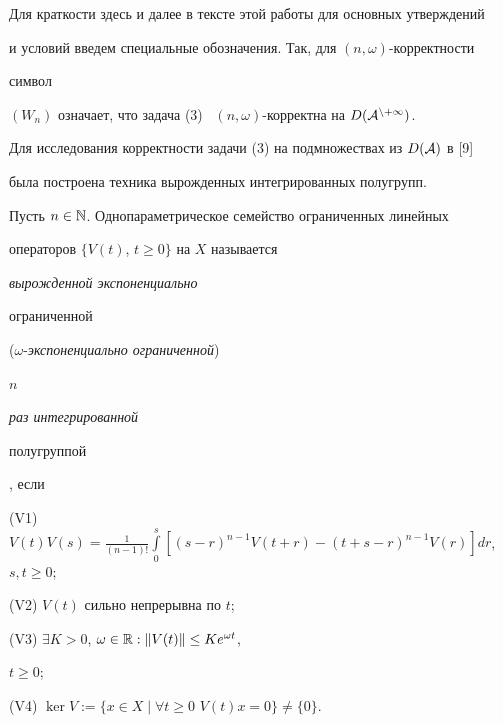  


Для краткости здесь и далее в тексте этой работы для основных утверждений 


и условий введем специальные обозначения. Так, для $(n,\omega)$-корректности 


символ 


\smallskip





\noindent{}$(W_n)$ означает, что задача (3) \ $(n,\omega)$-корректна на $D(\cal 


A^{n+1})$.


\smallskip


 


Для исследования корректности задачи (3) на подмножествах из $D(\cal A)$ в [9] 


была построена техника вырожденных интегрированных полугрупп. 


 


\begin{defn} 


Пусть $n\in\Bbb N$. Однопараметрическое семейство ограниченных линейных 


операторов $\{V(t)$, $t\ge0\}$ на $X$ называется


{\it вырожденной экспоненциально 


ограниченной} ($\omega$-{\it экспоненциально ограниченной})


$n$ {\it раз интегрированной 


полугруппой}, если 


 


({V1}) $V(t)V(s)=\frac{1}{(n-1)!}\int\limits^s_0[(s-r)^{n-1} 


V(t+r)-(t+s-r)^{n-1}V(r)]dr$, $s,t\ge0$; 


 


({V2}) $V(t)$ сильно непрерывна по $t$; 


 


({V3}) $\exists K>0$, $\omega\in\Bbb R:\|V(t)\|\le K e^{\omega t}$, 


$t\ge0$; 


 


({V4}) $\ker V:=\{x\in X\mid\forall t\ge0$ $V(t)x=0\}\ne\{0\}$. 


\end{defn} 


